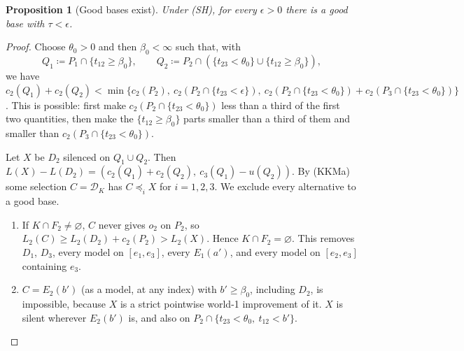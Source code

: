\documentclass[11pt]{article}
\newtheorem{proposition}[theorem]{Proposition}
\theoremstyle{definition}\newtheorem{definition}[theorem]{Definition}
\theoremstyle{remark}\newtheorem{remark}[theorem]{Remark}
\newcommand{\Dscr}{\mathcal D}
\begin{document}
\begin{proposition}[Good bases exist]\label{prop:good}
Under (SH), for every $\epsilon>0$ there is a good base with $\tau<\epsilon$.
\end{proposition}
\begin{proof}
Choose $\theta_0>0$ and then $\beta_0<\infty$ such that, with
\[
 Q_1\coloneqq P_1\cap\{t_{12}\ge\beta_0\},\qquad
 Q_2\coloneqq P_2\cap(\{t_{23}<\theta_0\}\cup\{t_{12}\ge\beta_0\}),
\]
we have
$c_2(Q_1)+c_2(Q_2)<\min\{c_2(P_2),\ c_2(P_2\cap\{t_{23}<\epsilon\}),\
c_2(P_2\cap\{t_{23}<\theta_0\})+c_2(P_3\cap\{t_{23}<\theta_0\})\}$. This is
possible: first make $c_2(P_2\cap\{t_{23}<\theta_0\})$ less than a third of
the first two quantities, then make the $\{t_{12}\ge\beta_0\}$ parts smaller
than a third of them and smaller than $c_2(P_3\cap\{t_{23}<\theta_0\})$.

Let $X$ be $D_2$ silenced on $Q_1\cup Q_2$. Then
$L(X)-L(D_2)=(c_2(Q_1)+c_2(Q_2),\ c_3(Q_1)-u(Q_2))$. By (KKMa) some selection
$C=\Dscr_K$ has $C\preceq_iX$ for $i=1,2,3$. We exclude every alternative to
a good base.
\begin{enumerate}[label=(\roman*),leftmargin=*,itemsep=2pt]
\item If $K\cap F_2\ne\varnothing$, $C$ never gives $o_2$ on $P_2$, so
$L_2(C)\ge L_2(D_2)+c_2(P_2)>L_2(X)$. Hence $K\cap F_2=\varnothing$. This
removes $D_1$, $D_3$, every model on $[e_1,e_3]$, every $E_1(a')$, and every
model on $[e_2,e_3]$ containing $e_3$.
\item $C=E_2(b')$ (as a model, at any index) with $b'\ge\beta_0$, including
$D_2$, is impossible, because
$X$ is a strict pointwise world-1 improvement of it. $X$ is silent wherever
$E_2(b')$ is, and also on $P_2\cap\{t_{23}<\theta_0,\ t_{12}<b'\}$.


\end{enumerate}
\end{proof}
\end{document}
